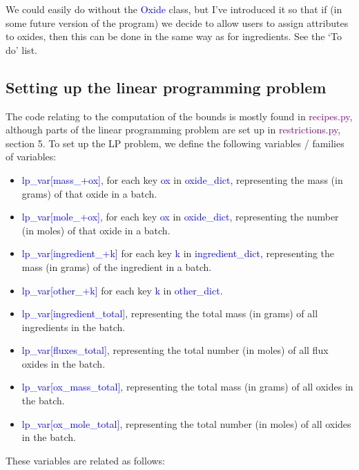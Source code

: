 \documentclass[a4paper,10pt]{article}
\def\'{\textquotesingle}
\def\blue{\textcolor{blue}}
\def\green{\textcolor{Purple}}
\def\lpv{lp\_var}
\begin{document}
We could easily do without the \blue{Oxide} class, but I've introduced it so that if (in some future version of the program) we decide to allow users to assign attributes to oxides, then this can be done in the same way as for ingredients. See the `To do' list.

\subsection{Setting up the linear programming problem}
The code relating to the computation of the bounds is mostly found in \newline
\green{recipes.py}, although parts of the linear programming problem are set up in \green{restrictions.py}, section 5. To set up the LP problem, we define the following variables / families of variables:
\begin{itemize}
\item \blue{\lpv[\'mass\_\'+ox]}, for each key \blue{ox} in \blue{oxide\_dict}, representing the mass (in grams) of that oxide in a batch.
\item \blue{\lpv[\'mole\_\'+ox]}, for each key \blue{ox} in \blue{oxide\_dict}, representing the number (in moles) of that oxide in a batch.
\item \blue{\lpv[\'ingredient\_\'+k]} for each key \blue{k} in \blue{ingredient\_dict}, representing the mass (in grams) of the ingredient in a batch.
\item \blue{\lpv[\'other\_\'+k]} for each key \blue{k} in \blue{other\_dict}. 
\item \blue{\lpv[\'ingredient\_total\']}, representing the total mass (in grams) of all ingredients in the batch.
\item \blue{\lpv[\'fluxes\_total\']}, representing the total number (in moles) of all flux oxides in the batch.
\item \blue{\lpv[\'ox\_mass\_total\']}, representing the total mass (in grams) of all oxides in the batch.
\item \blue{\lpv[\'ox\_mole\_total\']}, representing the total number (in moles) of all oxides in the batch.
\end{itemize}
%
These variables are related as follows:
%
\end{document}
